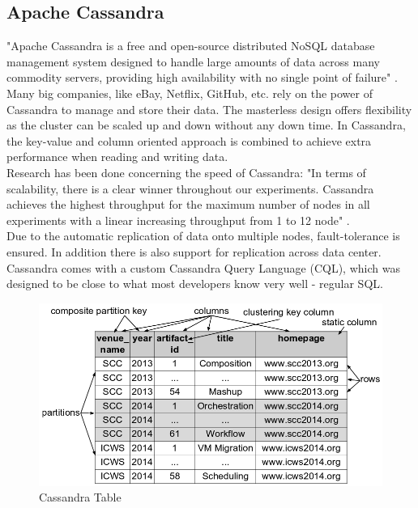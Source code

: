 \subsection{Apache Cassandra}
"Apache Cassandra is a free and open-source distributed NoSQL database management system designed to handle large amounts of data across many commodity servers, providing high availability with no single point of failure" \cite{cassandra_wikipedia}.\\
Many big companies, like eBay, Netflix, GitHub, etc. rely on the power of Cassandra to manage and store their data.
The masterless design offers flexibility as the cluster can be scaled up and down without any down time.
In Cassandra, the key-value and column oriented approach is combined to achieve extra performance when reading and writing data.\\
Research has been done concerning the speed of Cassandra: "In terms of scalability, there is a clear winner throughout our experiments.
Cassandra achieves the highest throughput for the maximum number of nodes in all experiments with a linear increasing throughput from 1 to 12 node" \cite{rabl2012solving}.\\
Due to the automatic replication of data onto multiple nodes, fault-tolerance is ensured.
In addition there is also support for replication across data center.\\
Cassandra comes with a custom Cassandra Query Language (CQL), which was designed to be close to what most developers know very well - regular SQL.

\begin{figure}[!htbp]
  \centering
  \includegraphics[keepaspectratio=true,scale=0.4]{img/cassandra_table}
    \caption{Cassandra Table \cite{chebotko2015big}}
  \label{fig:cassandra_table}
\end{figure}

